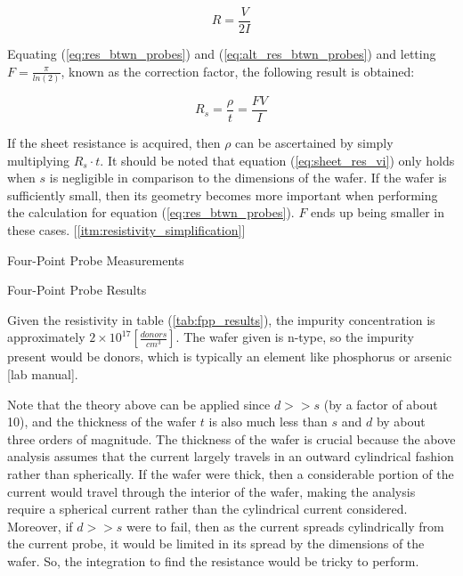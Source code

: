 \documentclass{article}
\begin{document}
\begin{equation}
\label{eq:alt_res_btwn_probes}
R = \frac{V}{2I}
\end{equation}

Equating (\ref{eq:res_btwn_probes}) and (\ref{eq:alt_res_btwn_probes}) and letting $F = \frac{\pi}{ln(2)}$, known as the correction factor, the following result is obtained:

\begin{equation}
\label{eq:sheet_res_vi}
R_s = \frac{\rho}{t} = \frac{ FV }{ I }
\end{equation}

If the sheet resistance is acquired, then $\rho$ can be ascertained by simply multiplying $R_s \cdot t$. It should be noted that equation (\ref{eq:sheet_res_vi}) only holds when $s$ is negligible in comparison to the dimensions of the wafer. If the wafer is sufficiently small, then its geometry becomes more important when performing the calculation for equation (\ref{eq:res_btwn_probes}). $F$ ends up being smaller in these cases. [\ref{itm:resistivity_simplification}] %


\FloatBarrier

\begin{table}[h!]
	\centering
	\caption{Four-Point Probe Measurements}
	\label{tab:fpp_measure}
\end{table}

\FloatBarrier

\begin{table}[h!]
	\centering
	\caption{Four-Point Probe Results}
	\label{tab:fpp_results}
\end{table}

\FloatBarrier

Given the resistivity in table (\ref{tab:fpp_results}), the impurity concentration is approximately $2 \times 10^{17} [\frac{donors}{cm^3}]$. The wafer given is n-type, so the impurity present would be donors, which is typically an element like phosphorus or arsenic [lab manual].

Note that the theory above can be applied since $d >> s$ (by a factor of about 10), and the thickness of the wafer $t$ is also much less than $s$ and $d$ by about three orders of magnitude. The thickness of the wafer is crucial because the above analysis assumes that the current largely travels in an outward cylindrical fashion rather than spherically. If the wafer were thick, then a considerable portion of the current would travel through the interior of the wafer, making the analysis require a spherical current rather than the cylindrical current considered. Moreover, if $d >> s$ were to fail, then as the current spreads cylindrically from the current probe, it would be limited in its spread by the dimensions of the wafer. So, the integration to find the resistance would be tricky to perform.%
\end{document}
